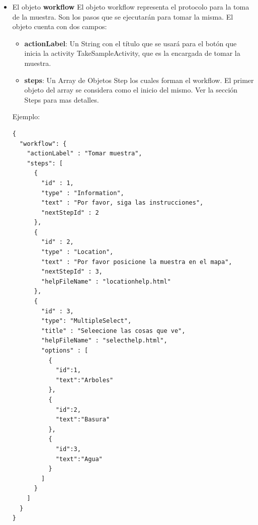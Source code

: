 \begin{itemize}
\begin{itemize}
		\item \textbf{paramNameAuthenticationType}: (Opcional) Un String con el nombre del parámetro dentro del mensaje HTTP POST en el que se enviará el tipo de autenticación que usó el usuario que envía la muestra. Este campo solo es necesario si se usa autenticación. Ver la sección Usando Autenticación para mas detalles.
	
	\end{itemize}
	
	
Ejemplo:
\begin{lstlisting}[language=XML, frame=tlb]
{
  "application": {
    "title" : "Samplers Hello World App",
    "welcomeMessage" : "Welcome to your first Samplers App!",
    "networkConfiguration" : {
      "url" : "http://192.168.1.10/samplers/upload.php",
      "paramName" : "sample",
      "paramNameUserId" : "user_id",
      "paramNameAuthenticationType" : "authentication_type"
    },
    "authenticationEnabled" : true,
    "authenticationOptional" : true,
    "googleMaps_API_KEY" : "your_google_maps_API_KEY",
    "mainHelpFileName" : "mainhelp.html"
  } 
}
\end{lstlisting}	
	
	
	\item El objeto \textbf{workflow}
	El objeto workflow representa el protocolo para la toma de la muestra. Son los pasos que se ejecutarán para tomar la misma.
	El objeto cuenta con dos campos:
		
	\begin{itemize}
	
		\item \textbf{actionLabel}: Un String con el título que se usará para el botón que inicia la activity TakeSampleActivity, que es la encargada de tomar la muestra.
		
		\item \textbf{steps}: Un Array de Objetos Step los cuales forman el workflow. El primer objeto del array se considera como el inicio del mismo. Ver la sección Steps para mas detalles.
	
	
	\end{itemize}	
	
	
Ejemplo:
\begin{lstlisting}[language=XML, frame=tlb]	
{
  "workflow": {
    "actionLabel" : "Tomar muestra",
    "steps": [
      {
        "id" : 1,
        "type" : "Information",
        "text" : "Por favor, siga las instrucciones",
        "nextStepId" : 2
      },
      {
        "id" : 2,
        "type" : "Location",
        "text" : "Por favor posicione la muestra en el mapa",
        "nextStepId" : 3,
        "helpFileName" : "locationhelp.html"
      },
      {
        "id" : 3,
        "type": "MultipleSelect",
        "title" : "Seleecione las cosas que ve",
        "helpFileName" : "selecthelp.html",
        "options" : [
          {
            "id":1,
            "text":"Arboles"
          },
          {
            "id":2,
            "text":"Basura"
          },
          {
            "id":3,
            "text":"Agua"
          }
        ]
      }
    ]
  }
}


\end{lstlisting}
\end{itemize}
